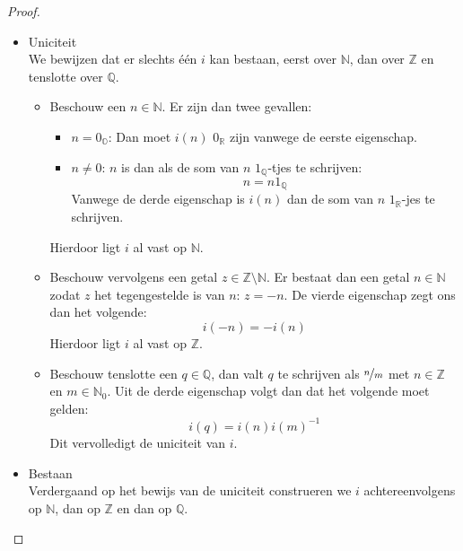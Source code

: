 \documentclass[main.tex]{subfiles}
\begin{document}
\begin{pr}
  \begin{proof}
    \begin{itemize}
    \item Uniciteit\\
      We bewijzen dat er slechts \'e\'en $i$ kan bestaan, eerst over $\mathbb{N}$, dan over $\mathbb{Z}$ en tenslotte over $\mathbb{Q}$.
      \begin{itemize}
      \item Beschouw een $n\in \mathbb{N}$.
        Er zijn dan twee gevallen:
        \begin{itemize}
        \item $n = 0_{\mathbb{O}}$:
          Dan moet $i(n)$ $0_{\mathbb{R}}$ zijn vanwege de eerste eigenschap.
        \item $n \neq 0$:
          $n$ is dan als de som van $n$ $1_{\mathbb{Q}}$-tjes te schrijven:\needed
          \[ n = n 1_{\mathbb{Q}} \]
          Vanwege de derde eigenschap is $i(n)$ dan de som van $n$ $1_{\mathbb{R}}$-jes te schrijven.
        \end{itemize}
        Hierdoor ligt $i$ al vast op $\mathbb{N}$. \waarom
      \item Beschouw vervolgens een getal $z\in \mathbb{Z}\setminus \mathbb{N}$.
        Er bestaat dan een getal $n \in \mathbb{N}$ zodat $z$ het tegengestelde is van $n$: $z = -n$.\needed
        De vierde eigenschap zegt ons dan het volgende:
        \[ i(-n) = -i(n) \]
        Hierdoor ligt $i$ al vast op $\mathbb{Z}$. \waarom
      \item Beschouw tenslotte een $q\in \mathbb{Q}$, dan valt $q$ te schrijven als $\nicefrac{n}{m}$ met $n\in \mathbb{Z}$ en $m\in \mathbb{N}_{0}$.
        Uit de derde eigenschap volgt dan dat het volgende moet gelden:
        \[ i(q) = i(n)i(m)^{-1} \]
        Dit vervolledigt de uniciteit van $i$.
      \end{itemize}
    \item Bestaan\\
      Verdergaand op het bewijs van de uniciteit construeren we $i$ achtereenvolgens op $\mathbb{N}$, dan op $\mathbb{Z}$ en dan op $\mathbb{Q}$.
    \end{itemize}
  \end{proof}
\end{pr}
\end{document}
